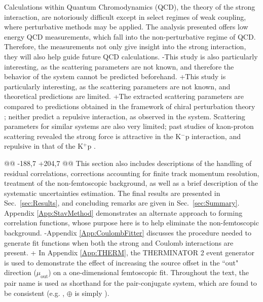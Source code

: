  Calculations within Quantum Chromodynamics (QCD), the theory of the strong interaction, are notoriously difficult except in select regimes of weak coupling, where perturbative methods may be applied. 
 The \LamK analysis presented offers low energy QCD measurements, which fall into the non-perturbative regime of QCD.
 Therefore, the \LamK measurements not only give insight into the strong interaction, they will also help guide future QCD calculations.
-This study is also particularly interesting, as the \LamK scattering parameters are not known, and therefore the behavior of the system cannot be predicted beforehand.
+This study is particularly interesting, as the \LamK scattering parameters are not known, and theoretical predictions are limited.
+The extracted scattering parameters are compared to predictions obtained in the framework of chiral perturbation theory \cite{Liu:2006xja,Mai:2009ce}; neither predict a repulsive interaction, as observed in the \LamKchP system.
 Scattering parameters for similar systems are also very limited; past studies of kaon-proton scattering revealed the strong force is attractive in the K$^{-}$p interaction, and repulsive in that of the K$^{+}$p \cite{Humphrey:1962zz, Hadjimichef:2002xe, Ikeda:2012au}.
 
@@ -188,7 +204,7 @@
 This section also includes descriptions of the handling of residual correlations, corrections accounting for finite track momentum resolution, treatment of the non-femtoscopic background, as well as a brief description of the systematic uncertainties estimation.  
 The final results are presented in Sec.\ \ref{sec:Results}, and concluding remarks are given in Sec.\ \ref{sec:Summary}.
 Appendix \ref{App:StavMethod} demonstrates an alternate approach to forming correlation functions, whose purpose here is to help eliminate the non-femtoscopic background.
-Appendix \ref{App:CoulombFitter} discusses the procedure needed to generate fit functions when both the strong and Coulomb interactions are present.
+%
 In Appendix \ref{App:THERM}, the THERMINATOR 2 event generator is used to demonstrate the effect of increasing the source offset in the ``out" direction ($\mu_{\mathrm{out}}$) on a one-dimensional femtoscopic fit.
 Throughout the text, the pair name is used as shorthand for the pair-conjugate system, which are found to be consistent (e.g. \LamKs, \LamKchP $\oplus$ \ALamKchM is simply \LamKchP).
 
